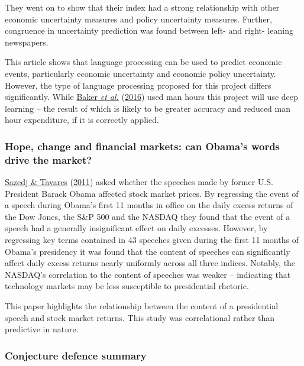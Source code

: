 \documentclass[11pt,preprint, authoryear]{elsarticle}
\numberwithin{equation}{section}
\numberwithin{figure}{section}
\numberwithin{table}{section}
\begin{document}
They went on to show that their index had a strong relationship with
other economic uncertainty measures and policy uncertainty measures.
Further, congruence in uncertainty prediction was found between left-
and right- leaning newspapers.

This article shows that language processing can be used to predict
economic events, particularly economic uncertainty and economic policy
uncertainty. However, the type of language processing proposed for this
project differs significantly. While
\protect\hyperlink{ref-baker2016measuring}{Baker \emph{et al.}}
(\protect\hyperlink{ref-baker2016measuring}{2016}) used man hours this
project will use deep learning -- the result of which is likely to be
greater accuracy and reduced man hour expenditure, if it is correctly
applied.

\hypertarget{hope-change-and-financial-markets-can-obamas-words-drive-the-market}{%
\subsubsection{\texorpdfstring{Hope, change and financial markets: can
Obama's words drive the market?
\label{Obama}}{Hope, change and financial markets: can Obama's words drive the market? }}\label{hope-change-and-financial-markets-can-obamas-words-drive-the-market}}

\protect\hyperlink{ref-sazedj2011hope}{Sazedj \& Tavares}
(\protect\hyperlink{ref-sazedj2011hope}{2011}) asked whether the
speeches made by former U.S. President Barack Obama affected stock
market prices. By regressing the event of a speech during Obama's first
11 months in office on the daily excess returns of the Dow Jones, the
S\&P 500 and the NASDAQ they found that the event of a speech had a
generally insignificant effect on daily excesses. However, by regressing
key terms contained in 43 speeches given during the first 11 months of
Obama's presidency it was found that the content of speeches can
significantly affect daily excess returns nearly uniformly across all
three indices. Notably, the NASDAQ's correlation to the content of
speeches was weaker -- indicating that technology markets may be less
susceptible to presidential rhetoric.

This paper highlights the relationship between the content of a
presidential speech and stock market returns. This study was
correlational rather than predictive in nature.

\hypertarget{conjecture-defence-summary}{%
\subsubsection{\texorpdfstring{Conjecture defence summary
\label{defence summary}}{Conjecture defence summary }}\label{conjecture-defence-summary}}
\end{document}

